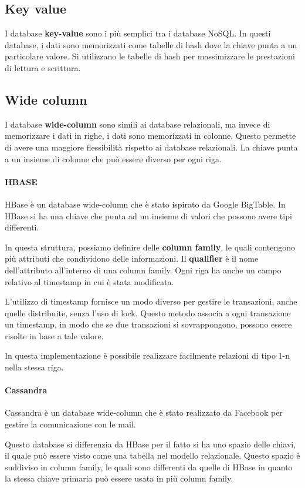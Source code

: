 \subsection{Key value}
I database \textbf{key-value} sono i più semplici tra i database NoSQL. In questi
database, i dati sono memorizzati come tabelle di hash dove la chiave punta a un
particolare valore. Si utilizzano le tabelle di hash per massimizzare le prestazioni
di lettura e scrittura.
\subsection{Wide column}
I database \textbf{wide-column} sono simili ai database relazionali, ma invece di
memorizzare i dati in righe, i dati sono memorizzati in colonne. Questo permette
di avere una maggiore flessibilità rispetto ai database relazionali. La chiave
punta a un insieme di colonne che può essere diverso per ogni riga.

\paragraph{HBASE}
HBase è un database wide-column che è stato ispirato da Google BigTable. In HBase
si ha una chiave che punta ad un insieme di valori che possono avere tipi differenti.

In questa struttura, possiamo definire delle \textbf{column family}, le quali
contengono più attributi che condividono delle informazioni. Il \textbf{qualifier} è
il nome dell'attributo all'interno di una column family. Ogni riga ha anche
un campo relativo al timestamp in cui è stata modificata.

L'utilizzo di timestamp fornisce un modo diverso per gestire le transazioni,
anche quelle distribuite, senza l'uso di lock. Questo metodo associa a ogni
transazione un timestamp, in modo che se due transazioni si sovrappongono,
possono essere risolte in base a tale valore.

In questa implementazione è possibile realizzare facilmente relazioni di tipo 1-n
nella stessa riga.
\paragraph{Cassandra}
Cassandra è un database wide-column che è stato realizzato da Facebook per gestire
la comunicazione con le mail.

Questo database si differenzia da HBase per il fatto si ha uno spazio delle chiavi,
il quale può essere visto come una tabella nel modello relazionale. Questo spazio
è suddiviso in column family, le quali sono differenti da quelle di HBase in quanto
la stessa chiave primaria può essere usata in più column family.

